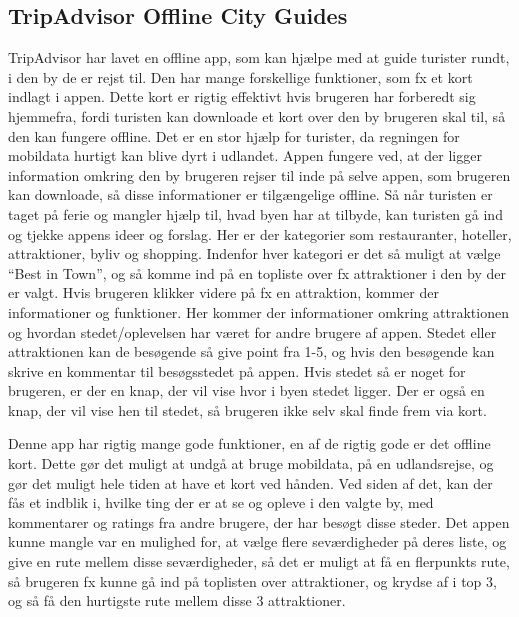 \subsection{TripAdvisor Offline City Guides}
TripAdvisor har lavet en offline app, som kan hjælpe med at guide turister rundt, i den by de er rejst til. Den har mange forskellige funktioner, som fx et kort indlagt i appen. Dette kort er rigtig effektivt hvis brugeren har forberedt sig hjemmefra, fordi turisten kan downloade et kort over den by brugeren skal til, så den kan fungere offline. Det er en stor hjælp for turister, da regningen for mobildata hurtigt kan blive dyrt i udlandet\citep {TDC}. \newline
Appen fungere ved, at der ligger information omkring den by brugeren rejser til inde på selve appen, som brugeren kan downloade, så disse informationer er tilgængelige offline. Så når turisten er taget på ferie og mangler hjælp til, hvad byen har at tilbyde, kan turisten gå ind og tjekke appens ideer og forslag. Her er der kategorier som restauranter, hoteller, attraktioner, byliv og shopping. Indenfor hver kategori er det så muligt at vælge “Best in Town”, og så komme ind på en topliste over fx attraktioner i den by der er valgt.\newline
Hvis brugeren klikker videre på fx en attraktion, kommer der informationer og funktioner. Her kommer der informationer omkring attraktionen og hvordan stedet/oplevelsen har været for andre brugere af appen. Stedet eller attraktionen kan de besøgende så give point fra 1-5, og hvis den besøgende kan skrive en kommentar til besøgsstedet på appen. Hvis stedet så er noget for brugeren, er der en knap, der vil vise hvor i byen stedet ligger. Der er også en knap, der vil vise hen til stedet, så brugeren ikke selv skal finde frem via kort.\newline

Denne app har rigtig mange gode funktioner, en af de rigtig gode er det offline kort. Dette gør det muligt at undgå at bruge mobildata, på en udlandsrejse, og gør det muligt hele tiden at have et kort ved hånden. Ved siden af det, kan der fås et indblik i, hvilke ting der er at se og opleve i den valgte by, med kommentarer og ratings fra andre brugere, der har besøgt disse steder.
Det appen kunne mangle var en mulighed for, at vælge flere seværdigheder på deres liste, og give en rute mellem disse seværdigheder, så det er muligt at få en flerpunkts rute, så brugeren fx kunne gå ind på toplisten over attraktioner, og krydse af i top 3, og så få den hurtigste rute mellem disse 3 attraktioner. 

